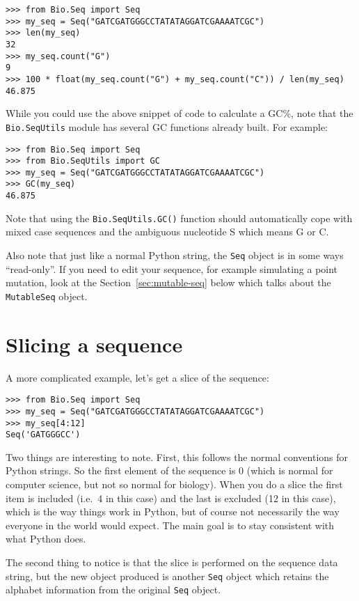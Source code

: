 \begin{verbatim}
>>> from Bio.Seq import Seq
>>> my_seq = Seq("GATCGATGGGCCTATATAGGATCGAAAATCGC")
>>> len(my_seq)
32
>>> my_seq.count("G")
9
>>> 100 * float(my_seq.count("G") + my_seq.count("C")) / len(my_seq)
46.875
\end{verbatim}

While you could use the above snippet of code to calculate a GC\%, note that  the \verb|Bio.SeqUtils| module has several GC functions already built.  For example:

\begin{verbatim}
>>> from Bio.Seq import Seq
>>> from Bio.SeqUtils import GC
>>> my_seq = Seq("GATCGATGGGCCTATATAGGATCGAAAATCGC")
>>> GC(my_seq)
46.875
\end{verbatim}

\noindent Note that using the \verb|Bio.SeqUtils.GC()| function should automatically cope with mixed case sequences and the ambiguous nucleotide S which means G or C.

Also note that just like a normal Python string, the \verb|Seq| object is in some ways ``read-only''.  If you need to edit your sequence, for example simulating a point mutation, look at the Section~\ref{sec:mutable-seq} below which talks about the \verb|MutableSeq| object.

\section{Slicing a sequence}

A more complicated example, let's get a slice of the sequence:

\begin{verbatim}
>>> from Bio.Seq import Seq
>>> my_seq = Seq("GATCGATGGGCCTATATAGGATCGAAAATCGC")
>>> my_seq[4:12]
Seq('GATGGGCC')
\end{verbatim}

Two things are interesting to note. First, this follows the normal conventions for Python strings.  So the first element of the sequence is 0 (which is normal for computer science, but not so normal for biology). When you do a slice the first item is included (i.e.~4 in this case) and the last is excluded (12 in this case), which is the way things work in Python, but of course not necessarily the way everyone in the world would expect. The main goal is to stay consistent with what Python does.

The second thing to notice is that the slice is performed on the sequence data string, but the new object produced is another \verb|Seq| object which retains the alphabet information from the original \verb|Seq| object.

